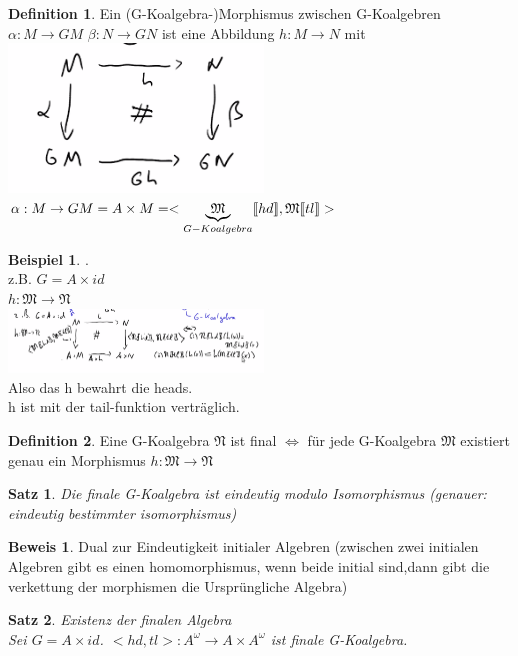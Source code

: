 \documentclass{article}
\newtheorem{satz}{Satz}
\theoremstyle{definition}
\newtheorem{beweis}{Beweis}[section]
\newtheorem{beispiel}{Beispiel}[section]
\newtheorem{definition}{Definition}[section]
\begin{document}
	\begin{definition} Ein (G-Koalgebra-)Morphismus zwischen G-Koalgebren $\alpha:M\to GM$ $\beta:N\to GN$ ist eine Abbildung $h:M\to N$ mit\\
	\includegraphics[width=256px]{images/G-Morphismus.png}\\
	$\alpha: M\to GM = A\times M = <\underbrace{\mathfrak{M}}_{G-Koalgebra}\llbracket hd\rrbracket,\mathfrak{M}\llbracket tl\rrbracket>$
	\end{definition}
	\begin{beispiel}.\\
	z.B. $G=A\times id$\\
	$h:\mathfrak{M}\to\mathfrak{N}$\\
	\includegraphics[width=256px]{images/G-KoalgebraBeispiel.png}\\
	Also das h bewahrt die heads.\\
	h ist mit der tail-funktion verträglich.\\
	\end{beispiel}
	\begin{definition} Eine G-Koalgebra $\mathfrak{N}$ ist final $\iff$ für jede G-Koalgebra $\mathfrak{M}$ existiert genau ein Morphismus $h:\mathfrak{M}\to\mathfrak{N}$\\
	\end{definition}
	\begin{satz} Die finale G-Koalgebra ist eindeutig modulo Isomorphismus (genauer: eindeutig bestimmter isomorphismus)
	\end{satz}
	\begin{beweis} Dual zur Eindeutigkeit initialer Algebren (zwischen zwei initialen Algebren gibt es einen homomorphismus, wenn beide initial sind,dann gibt die verkettung der morphismen die Ursprüngliche Algebra)
	\end{beweis}
	\begin{satz} Existenz der finalen Algebra\\
	Sei $G=A\times id$. $<hd,tl>:A^\omega\to A\times A^\omega$ ist finale G-Koalgebra.\\
	\end{satz}
\end{document}
